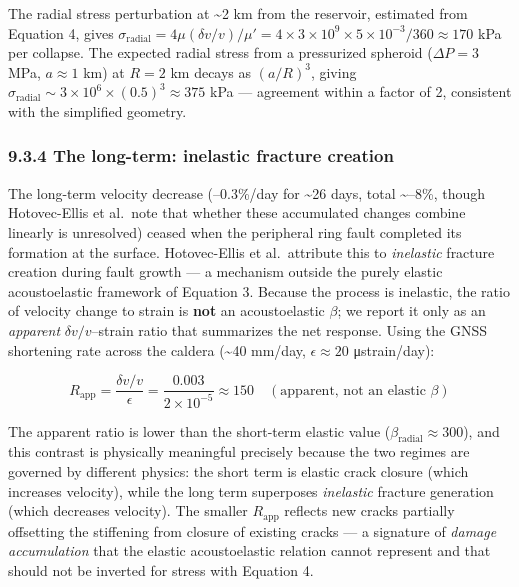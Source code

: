 \documentclass[12pt]{article}
\begin{document}
The radial stress perturbation at \textasciitilde2 km from the
reservoir, estimated from Equation 4, gives
\(\sigma_{\text{radial}} = 4\mu(\delta v/v)/\mu' = 4 \times 3 \times 10^9 \times 5 \times 10^{-3}/360 \approx 170\)
kPa per collapse. The expected radial stress from a pressurized spheroid
(\(\Delta P = 3\) MPa, \(a \approx 1\) km) at \(R = 2\) km decays as
\((a/R)^3\), giving
\(\sigma_{\text{radial}} \sim 3 \times 10^6 \times (0.5)^3 \approx 375\)
kPa --- agreement within a factor of 2, consistent with the simplified
geometry.

\subsubsection{9.3.4 The long-term: inelastic fracture
creation}\label{the-long-term-inelastic-fracture-creation}

The long-term velocity decrease (--0.3\%/day for \textasciitilde26 days,
total \textasciitilde--8\%, though Hotovec-Ellis et al.~note that
whether these accumulated changes combine linearly is unresolved) ceased
when the peripheral ring fault completed its formation at the surface.
Hotovec-Ellis et al.~attribute this to \emph{inelastic} fracture
creation during fault growth --- a mechanism outside the purely elastic
acoustoelastic framework of Equation 3. Because the process is
inelastic, the ratio of velocity change to strain is \textbf{not} an
acoustoelastic \(\beta\); we report it only as an \emph{apparent}
\(\delta v/v\)--strain ratio that summarizes the net response. Using the
GNSS shortening rate across the caldera (\textasciitilde40 mm/day,
\(\epsilon \approx 20\) μstrain/day):

\[R_{\text{app}} = \frac{\delta v/v}{\epsilon} = \frac{0.003}{2 \times 10^{-5}} \approx 150 \quad (\text{apparent, not an elastic } \beta)\]

The apparent ratio is lower than the short-term elastic value
(\(\beta_{\text{radial}} \approx 300\)), and this contrast is physically
meaningful precisely because the two regimes are governed by different
physics: the short term is elastic crack closure (which increases
velocity), while the long term superposes \emph{inelastic} fracture
generation (which decreases velocity). The smaller \(R_{\text{app}}\)
reflects new cracks partially offsetting the stiffening from closure of
existing cracks --- a signature of \emph{damage accumulation} that the
elastic acoustoelastic relation cannot represent and that should not be
inverted for stress with Equation 4.
\end{document}
